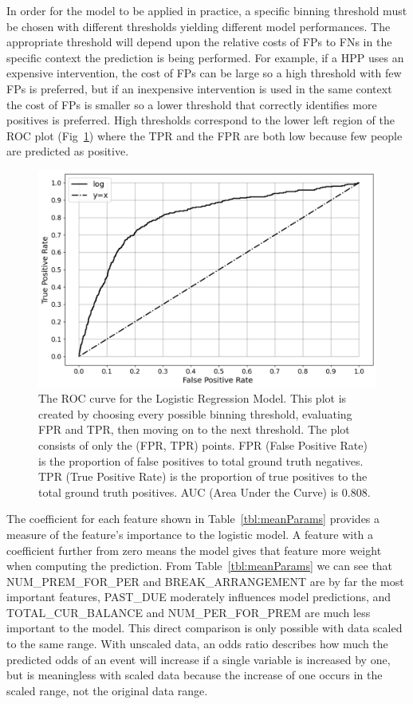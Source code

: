\documentclass[10pt,letterpaper]{article}
\newcommand{\red}[1]{{\color{red}{#1}}}
\begin{document}
In order for the model to be applied in practice, a specific binning threshold must be chosen with different thresholds yielding different model performances. The appropriate threshold will depend upon the relative costs of FPs to FNs in the specific context the prediction is being performed. For example, if a HPP uses an expensive intervention, the cost of FPs can be large so a high threshold with few FPs is preferred, but if an inexpensive intervention is used in the same context the cost of FPs is smaller so a lower threshold that correctly identifies more positives is preferred. High thresholds correspond to the lower left region of the ROC plot (Fig~\ref{fig:ROC}) where the TPR and the FPR are both low because few people are predicted as positive. \red{remove this paragraph?}

\begin{figure}[htb]
    \centering
    \includegraphics[width=\textwidth]{../img/ROC.png}
    \caption[ROC curve]{The ROC curve for the Logistic Regression Model. This plot is created by choosing every possible binning threshold, evaluating FPR and TPR, then moving on to the next threshold. The plot consists of only the (FPR, TPR) points. FPR (False Positive Rate) is the proportion of false positives to total ground truth negatives. TPR (True Positive Rate) is the proportion of true positives to the total ground truth positives. AUC (Area Under the Curve) is 0.808. \red{REMOVE GRAPHICS BEFORE SUBMISSION}}
    \label{fig:ROC}
\end{figure}

The coefficient for each feature shown in Table~\ref{tbl:meanParams} provides a measure of the feature's importance to the logistic model. A feature with a coefficient further from zero means the model gives that feature more weight when computing the prediction. From Table~\ref{tbl:meanParams} we can see that NUM\_PREM\_FOR\_PER and BREAK\_ARRANGEMENT are by far the most important features, PAST\_DUE moderately influences model predictions, and TOTAL\_CUR\_BALANCE and NUM\_PER\_FOR\_PREM are much less important to the model. This direct comparison is only possible with data scaled to the same range. With unscaled data, an odds ratio describes how much the predicted odds of an event will increase if a single variable is increased by one, but is meaningless with scaled data because the increase of one occurs in the scaled range, not the original data range. 
\end{document}
